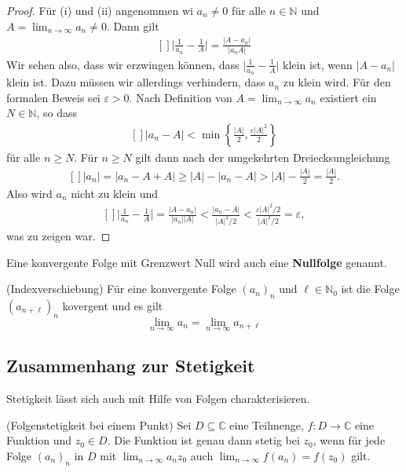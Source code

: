 \documentclass[../Analysis1_script.tex]{subfiles}
\begin{document}
\begin{proof}
	Für (i) und (ii) angenommen wi $a_n \neq 0$ für alle $n \in \mathbb{N}$ und $A = \lim_{n \to \infty} a_n \neq 0$. Dann gilt
	\[\begin{aligned}[]
		\bigg |\frac {1}{a_n}- \frac {1}{A} \bigg | = \frac {|A-a_n|}{|a_nA|}
	\end{aligned}\]
	Wir sehen also, dass wir erzwingen können, dass $\big |\frac {1}{a_n}- \frac {1}{A} \big |$ klein ist, wenn $|A-a_n|$ klein ist. Dazu müssen wir allerdings verhindern, dass $a_n$ zu klein wird. Für den formalen Beweis sei $\varepsilon >0$. Nach Definition von $A=\lim _{n \to \infty }a_n$ existiert ein $N \in \mathbb {N}$, so dass
	\[\begin{aligned}[]
		|a_n-A| < \min \left \lbrace {\frac {|A|}{2},\frac {\varepsilon |A|^2}{2}} \right \rbrace
	\end{aligned}\]
	für alle $n \geq N$. Für $n \geq N$ gilt dann nach der umgekehrten Dreiecksungleichung
	\[\begin{aligned}[]
		|a_n| = |a_n -A + A| \geq |A| - |a_n-A| > |A| - \frac {|A|}{2} = \frac {|A|}{2}.
	\end{aligned}\]
	Also wird $a_n$ nicht zu klein und
	\[\begin{aligned}[]
		\bigg |\frac {1}{a_n}- \frac {1}{A} \bigg | = \frac {|A-a_n|}{|a_n||A|} < \frac {|a_n-A|}{|A|^2/2} < \frac {\varepsilon |A|^2/2}{|A|^2/2} = \varepsilon ,
	\end{aligned}\]
	was zu zeigen war.
\end{proof}

Eine konvergente Folge mit Grenzwert Null wird auch eine \textbf{Nullfolge} genannt.

\begin{lemma}{(Indexverschiebung)}\label{lemma:index_shift}
	Für eine konvergente Folge $(a_n)_n$ und $\ell \in \mathbb{N}_0$ ist die Folge $(a_{n + \ell})_n$ kovergent und es gilt
	\[\lim_{n \to \infty} a_n = \lim_{n \to \infty} a_{n + \ell}\]
\end{lemma}

\subsection{Zusammenhang zur Stetigkeit}

Stetigkeit lässt sich auch mit Hilfe von Folgen charakterisieren.

\begin{proposition}{(Folgenstetigkeit bei einem Punkt)}
	Sei $D \subseteq \mathbb{C}$ eine Teilmenge, $f : D \to \mathbb{C}$ eine Funktion und $z_0 \in D$. Die Funktion ist genau dann stetig bei $z_0$, wenn für jede Folge $(a_n)_n$ in $D$ mit $\lim_{n \to \infty}a_n z_0$ auch $\lim_{n \to \infty}f(a_n) = f(z_0)$ gilt.
\end{proposition}
\end{document}
